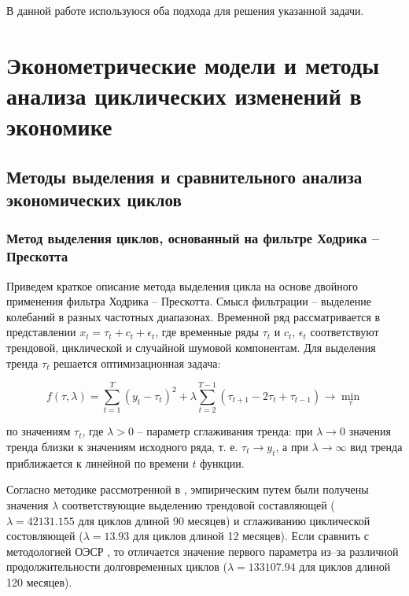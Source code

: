 \documentclass[../report.tex]{subfiles}
\begin{document}
	В данной работе используюся оба подхода для решения указанной задачи.
	
	
	
	\chapter{Эконометрические модели и методы анализа циклических изменений в экономике}
	
	
	\section{Методы выделения и сравнительного анализа экономических циклов}
	
	\subsection{Метод выделения циклов, основанный на фильтре Ходрика – Прескотта}
	
	Приведем краткое описание метода выделения цикла на основе двойного применения фильтра Ходрика – Прескотта. Смысл фильтрации – выделение колебаний в разных частотных диапазонах. Временной ряд рассматривается в представлении $ x_{t} = \tau_{t} + c_{t} + \epsilon_{t}$, где временные ряды $\tau_{t}$ и $c_{t}$, $\epsilon_{t}$ соответствуют трендовой, циклической и случайной шумовой компонентам. Для выделения тренда $\tau_{t}$ решается оптимизационная задача:
	
	\begin{equation} 
	f(\tau, \lambda) = \sum_{t=1}^{T} (y_t-\tau_{t})^2 + \lambda \sum_{t=2}^{T-1} (\tau_{t+1} - 2\tau_{t} + \tau_{t-1}) \rightarrow \min_{\tau} 
	\end{equation}
	
	по значениям $\tau_{t}$, где $\lambda > 0$ – параметр сглаживания тренда: при $\lambda \rightarrow 0$  значения тренда близки к значениям исходного ряда, т. е.  $\tau_{t} \rightarrow y_{t}$, а при $\lambda \rightarrow \infty$ вид тренда приближается  к линейной по времени $t$  функции.
	
	Согласно методике рассмотренной в \cite{esiMaking,esiExtra}, эмпирическим путем были получены значения $\lambda$ соответствующие выделению трендовой составляющей ($\lambda=42131.155$ для циклов длиной 90 месяцев) и сглаживанию циклической состовляющей ($\lambda=13.93$ для циклов длиной 12 месяцев). Если сравнить с методологией ОЭСР \cite{oecdCycleExtraction}, то отличается значение первого параметра из–за различной продолжительности долговременных циклов ($\lambda=133107.94$ для циклов длиной 120 месяцев).
	
\end{document}
